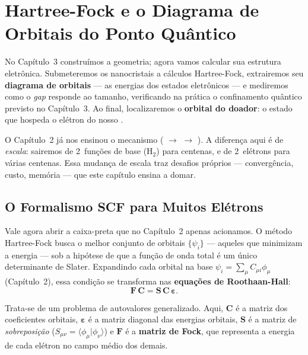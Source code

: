 \chapter{Hartree-Fock e o Diagrama de Orbitais do Ponto Quântico}
\label{cap:hf}

No Capítulo~3 construímos a geometria; agora vamos calcular sua estrutura
eletrônica. Submeteremos os nanocristais a cálculos Hartree-Fock, extrairemos seu
\textbf{diagrama de orbitais} --- as energias dos estados eletrônicos --- e
mediremos como o \emph{gap} responde ao tamanho, verificando na prática o
confinamento quântico previsto no Capítulo~3. Ao final, localizaremos o
\textbf{orbital do doador}: o estado que hospeda o elétron do nosso \qubit{}.

O Capítulo~2 já nos ensinou o mecanismo ( $\rightarrow$ 
$\rightarrow$ ). A diferença aqui é de \emph{escala}: sairemos de
2~funções de base (H$_2$) para centenas, e de 2~elétrons para várias centenas.
Essa mudança de escala traz desafios próprios --- convergência, custo, memória ---
que este capítulo ensina a domar.

\section{O Formalismo SCF para Muitos Elétrons}
\label{sec:formalismo}

Vale agora abrir a caixa-preta que no Capítulo~2 apenas acionamos. O método
Hartree-Fock busca o melhor conjunto de orbitais $\{\psi_i\}$ --- aqueles que
minimizam a energia --- sob a hipótese de que a função de onda total é um único
determinante de Slater. Expandindo cada orbital na base
$\psi_i = \sum_\mu C_{\mu i}\phi_\mu$ (Capítulo~2), essa condição se transforma nas
\textbf{equações de Roothaan-Hall}:
\begin{equation}
  \mathbf{F}\,\mathbf{C} = \mathbf{S}\,\mathbf{C}\,\boldsymbol{\varepsilon}.
  \label{eq:roothaan}
\end{equation}

\noindent
Trata-se de um problema de autovalores generalizado. Aqui, $\mathbf{C}$ é a matriz
dos coeficientes orbitais, $\boldsymbol{\varepsilon}$ é a matriz diagonal das
energias orbitais, $\mathbf{S}$ é a matriz de \emph{sobreposição}
($S_{\mu\nu} = \langle\phi_\mu|\phi_\nu\rangle$) e $\mathbf{F}$ é a
\textbf{matriz de Fock}, que representa a energia de cada elétron no campo médio
dos demais.

